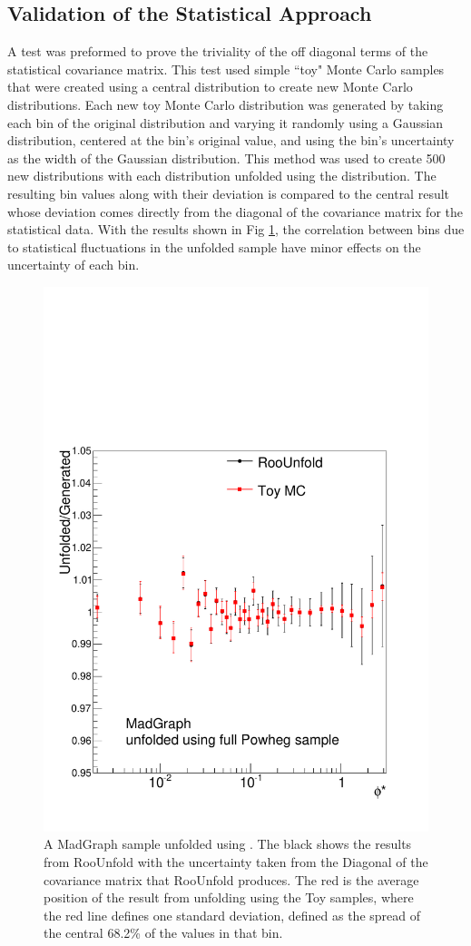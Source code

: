\subsection{Validation of the Statistical Approach}
A test was  preformed to prove the triviality of the off diagonal terms of the statistical covariance matrix. This test used simple ``toy" Monte Carlo samples that were created using a central \MADGRAPH \phistar distribution to create new Monte Carlo distributions. Each new toy Monte Carlo distribution was generated by taking each bin of the original \MADGRAPH distribution and varying it randomly using a Gaussian distribution, centered at the bin's original value, and using the bin's uncertainty as the width of the Gaussian distribution. This method was used to create 500 new distributions with each distribution unfolded using the \POWHEG distribution. The resulting bin values along with their deviation is compared to the central result whose deviation comes directly from the diagonal of the covariance matrix for the statistical data.  With the results shown in Fig \ref{fig:BinMigrationWToys}, the correlation between bins due to statistical fluctuations in the unfolded sample have minor effects on the uncertainty of each bin. 

\begin{figure}[!htbp]
    \centering
    \includegraphics[width=.8\textwidth]{figures/Unfolding/BinM_PM_ALL.pdf}
    \caption[
        BinMigration
    ]{
A MadGraph sample unfolded using \POWHEG. The black shows the results from RooUnfold with the uncertainty taken from the Diagonal of the covariance matrix that RooUnfold produces. The red is the average position of the result from unfolding using the Toy samples, where the red line defines one standard deviation, defined as the spread of the central 68.2\% of the values in that bin. 
    }
    \label{fig:BinMigrationWToys}
\end{figure}
